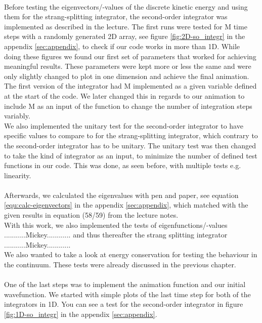 \documentclass[11pt, letterpaper, onecolumn]{article}
\begin{document}
	\\
	Before testing the eigenvectors/-values of the discrete kinetic energy and using them for the strang-splitting integrator, the second-order integrator was implemented as described in the lecture. The first runs were tested for M time steps with a randomly generated 2D array, see figure \ref{fig:2D-so_integr} in the appendix \ref{sec:appendix}, to check if our code works in more than 1D. While doing these figures we found our first set of parameters that worked for achieving meaningful results. These parameters were kept more or less the same and were only slightly changed to plot in one dimension and achieve the final animation. \\
	The first version of the integrator had M implemented as a given variable defined at the start of the code. We later changed this in regards to our animation to include M as an input of the function to change the number of integration steps variably. \\
	We also implemented the unitary test for the second-order integrator to have specific values to compare to for the strang-splitting integrator, which contrary to the second-order integrator has to be unitary. The unitary test was then changed to take the kind of integrator as an input, to minimize the number of defined test functions in our code. This was done, as seen before, with multiple tests e.g. linearity.
	\\
	\\
	Afterwards, we calculated the eigenvalues with pen and paper, see equation \ref{equ:calc-eigenvectors} in the appendix \ref{sec:appendix}, which matched with the given results in equation (58/59) from the lecture notes. \\
	With this work, we also implemented the tests of eigenfunctions/-values ...........Mickey............ and thus thereafter the strang splitting integrator ...........Mickey............ \\
	We also wanted to take a look at energy conservation for testing the behaviour in the continuum. These tests were already discussed in the previous chapter.
	\\
	\\
	One of the last steps was to implement the animation function and our initial wavefunction. We started with simple plots of the last time step for both of the integrators in 1D. You can see a test for the second-order integrator in figure \ref{fig:1D-so_integr} in the appendix \ref{sec:appendix}. \\
\end{document}
